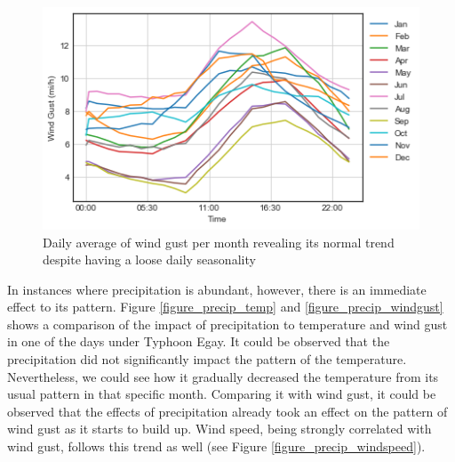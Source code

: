 \begin{figure}
  \includegraphics[width=\linewidth]{figures/figure_windgust.png}
  \caption{Daily average of wind gust per month revealing its normal trend despite having a loose daily seasonality}
  \label{figure_windgust}
\end{figure}





In instances where precipitation is abundant, however, there is an immediate effect to its pattern. Figure \ref{figure_precip_temp} and \ref{figure_precip_windgust} shows a comparison of the impact of precipitation to temperature and wind gust in one of the days under Typhoon Egay. It could be observed that the precipitation did not significantly impact the pattern of the temperature. Nevertheless, we could see how it gradually decreased the temperature from its usual pattern in that specific month. Comparing it with wind gust, it could be observed that the effects of precipitation already took an effect on the pattern of wind gust as it starts to build up. Wind speed, being strongly correlated with wind gust, follows this trend as well (see Figure \ref{figure_precip_windspeed}).






